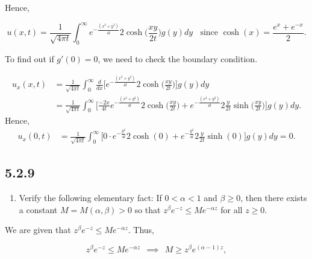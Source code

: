 \documentclass{article}
\begin{document}
Hence, 

$$u(x,t) = \frac{1}{\sqrt{4\pi t}}\int_{0}^{\infty}e^{-\frac{(x^2+y^2)}{4t}}2\cosh{\Big(\frac{xy}{2t}\Big)}g(y)dy ~~~~ \text{since  $\cosh(x)=\frac{e^x+e^{-x}}{2}$}.$$

To find out if $g'(0)=0$, we need to check the boundary condition. 

\begin{equation*}
\begin{split}
u_x(x,t)&=\frac{1}{\sqrt{4\pi t}}\int_{0}^{\infty}\frac{d}{dx}\Big[e^{-\frac{(x^2+y^2)}{4t}}2\cosh{\Big(\frac{xy}{2t}\Big)\Big]}g(y)dy \\&=
\frac{1}{\sqrt{4\pi t}}\int_{0}^{\infty}\Bigg[\frac{-2x}{4t}e^{-\frac{(x^2+y^2)}{4t}}2\cosh{\Big(\frac{xy}{2t}\Big)}+e^{-\frac{(x^2+y^2)}{4t}}2\frac{y}{2t}\sinh{\Big(\frac{xy}{2t}\Big)}\Bigg]g(y)dy.
\end{split}
\end{equation*}
Hence,
\begin{equation*}
\begin{split}
u_x(0,t)&=\frac{1}{\sqrt{4\pi t}}\int_{0}^{\infty}\Bigg[0\cdot {e^{-\frac{y^2}{4t}}}2\cosh(0)+e^{-\frac{y^2}{4t}}2\frac{y}{2t}\sinh(0)\Bigg]g(y)dy=0.
\end{split}
\end{equation*}
\subsection{\textbf{5.2.9}}
\begin{enumerate}[label=(\alph*),start=2]
    \item Verify the following elementary fact: If $0<\alpha<1$ and $\beta\geq 0$, then there exists a constant $M=M(\alpha,\beta)>0$ so that $z^{\beta}e^{-z}\leq Me^{-\alpha z} $ for all $z \geq 0$.
\end{enumerate}

We are given that $z^{\beta}e^{-z}\leq Me^{-\alpha z}$. Thus,

$$z^{\beta}e^{-z}\leq Me^{-\alpha z} ~~\implies~~ M\geq z^{\beta}e^{(\alpha-1)z},$$
\end{document}
